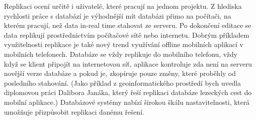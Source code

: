       Replikaci ocení určitě i uživatelé, které pracují na jednom
      projektu. Z hlediska rychlosti práce s databází je výhodnější mít
      databázi přimo na počítači, na kterém pracují, než data in-real
      time stahovat ze serveru. Po dokončení editace se data replikují
      prostřednictvím počítačové sítě nebo internetu. Dobrým příkladem
      využitelnosti replikace je také nový trend využívání offline
      mobilních aplikací v mobilních telefonech. Databáze se vždy
      replikuje do mobilního telefonu, vždy když se klient připojít na
      internetovou síť, aplikace kontroluje zda není na serveru novější
      verze databáze a pokud je, zkopíruje pouze změny, které proběhly
      od posledního stahování. (Jako příklad z geoinformatického
      prostředí bych uvedla diplomovou práci Dalibora Janáka, který řeší
      replikaci databáze lezeckých cest do mobilní aplikace.) Databázové
      systémy nabízí širokou škálu nastavitelnosti, která umožňuje
      přizpůsobit replikaci danému řešení. 


